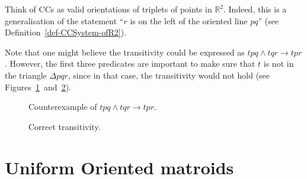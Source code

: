 
Think of CCs as valid orientations of triplets of points in $\mathbb{R}^2$.
Indeed, this is a generalisation of the statement ``$r$ is on the left of the oriented line $pq$'' (see Definition~\ref{def-CCSystem-ofR2}).


Note that one might believe the transitivity could be expressed as $tpq \land tqr \rightarrow tpr$.
However, the first three predicates are important to make sure that $t$ is not in the triangle ${\Delta}pqr$,
since in that case, the transitivity would not hold (see Figures~\ref{fig:CC:false-transitivity}~and~\ref{fig:CC:true-transitivity}).

\begin{figure}[!h]
\centering
{}
\caption{Counterexample of $tpq \land tqr \rightarrow tpr$.
\label{fig:CC:false-transitivity}}
\end{figure}
\begin{figure}
\centering
{}
\caption{Correct transitivity.
\label{fig:CC:true-transitivity}}
\end{figure}






\chapter{Uniform Oriented matroids}

